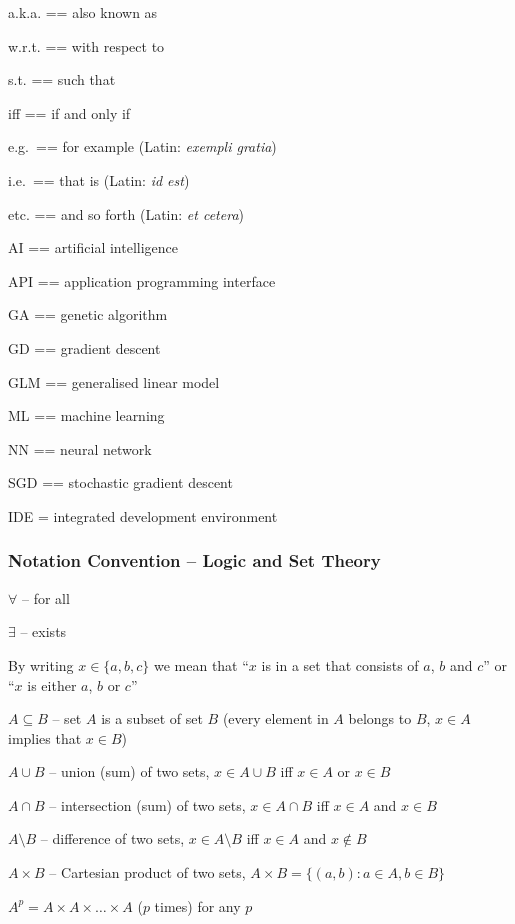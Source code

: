 \documentclass[10pt,b5paper,krantz1]{krantz}
\begin{document}
a.k.a. == also known as

w.r.t. == with respect to

s.t. == such that

iff == if and only if

e.g.~== for example (Latin: \emph{exempli gratia})

i.e.~== that is (Latin: \emph{id est})

etc. == and so forth (Latin: \emph{et cetera})

AI == artificial intelligence

API == application programming interface

GA == genetic algorithm

GD == gradient descent

GLM == generalised linear model

ML == machine learning

NN == neural network

SGD == stochastic gradient descent

IDE = integrated development environment

\hypertarget{notation-convention-logic-and-set-theory}{%
\subsubsection*{Notation Convention -- Logic and Set Theory}\label{notation-convention-logic-and-set-theory}}


\(\forall\) -- for all

\(\exists\) -- exists

By writing \(x \in \{a, b, c\}\) we mean that
``\(x\) is in a set that consists of \(a\), \(b\) and \(c\)''
or ``\(x\) is either \(a\), \(b\) or \(c\)''

\(A\subseteq B\) -- set \(A\) is a subset of set \(B\)
(every element in \(A\) belongs to \(B\),
\(x\in A\) implies that \(x\in B\))

\(A\cup B\) -- union (sum) of two sets,
\(x\in A\cup B\) iff \(x\in A\) or \(x\in B\)

\(A\cap B\) -- intersection (sum) of two sets,
\(x\in A\cap B\) iff \(x\in A\) and \(x\in B\)

\(A\setminus B\) -- difference of two sets,
\(x\in A\setminus B\) iff \(x\in A\) and \(x\not\in B\)

\(A\times B\) -- Cartesian product of two sets,
\(A\times B = \{ (a,b): a\in A, b\in B \}\)

\(A^p = A\times A \times \dots\times A\) (\(p\) times) for any \(p\)
\end{document}
